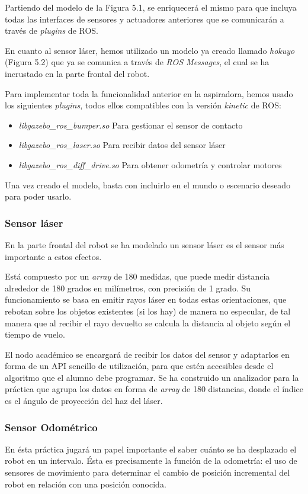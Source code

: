 Partiendo del modelo de la Figura 5.1, se enriquecerá el mismo para que incluya todas las interfaces de sensores y actuadores anteriores que se comunicarán a través de \textit{plugins} de ROS.

En cuanto al sensor láser, hemos utilizado un modelo ya creado llamado \textit{hokuyo} (Figura 5.2) que ya se comunica a través de \textit{ROS Messages}, el cual se ha incrustado en la parte frontal del robot.

Para implementar toda la funcionalidad anterior en la aspiradora, hemos usado los siguientes \textit{plugins}, todos ellos compatibles con la versión \textit{kinetic} de ROS:

\begin{itemize}
	\item \textit{libgazebo\_ros\_bumper.so} 
Para gestionar el sensor de contacto
	\item \textit{libgazebo\_ros\_laser.so}  
Para recibir datos del sensor láser
	\item \textit{libgazebo\_ros\_diff\_drive.so } 
Para obtener odometría y controlar motores
\end{itemize}

Una vez creado el modelo, basta con incluirlo en el mundo o escenario deseado para poder usarlo.

\subsubsection{Sensor láser}
En la parte frontal del robot se ha modelado un sensor láser es el sensor más importante a estos efectos. 

Está compuesto por un \textit{array} de 180 medidas, que puede medir distancia alrededor de 180 grados en milímetros, con precisión de 1 grado. Su funcionamiento se basa en emitir rayos láser en todas estas orientaciones, que rebotan sobre los objetos existentes (si los hay) de manera no especular, de tal manera que al recibir el rayo devuelto se calcula la distancia al objeto según el tiempo de vuelo.

El nodo académico se encargará de recibir los datos del sensor y adaptarlos en forma de un API sencillo de utilización, para que estén accesibles desde el algoritmo que el alumno debe programar. Se ha construido un analizador para la práctica que agrupa los datos en forma de \textit{array} de 180 distancias, donde el índice es el ángulo de proyección del haz del láser.
 
\subsubsection{Sensor Odométrico}
En ésta práctica jugará un papel importante el saber cuánto se ha desplazado el robot en un intervalo. Ésta es precisamente la función de la odometría: el uso de sensores de movimiento para determinar el cambio de posición incremental del robot en relación con una posición conocida.

